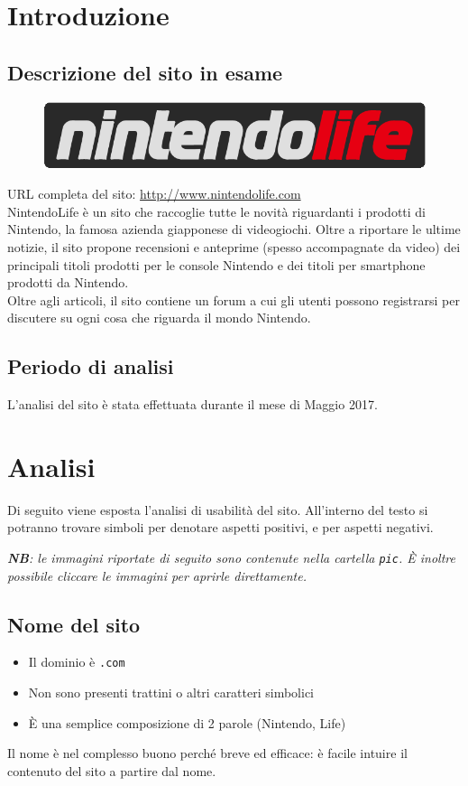 \documentclass[12pt, a4paper,titlepage]{article}
\newcommand{\cmark}{\ding{51}}%
\newcommand{\xmark}{\ding{55}}%
\begin{document}
\section{Introduzione}
\label{sec:introduzione}
\subsection{Descrizione del sito in esame}
\begin{figure}[h]
\centering
\includegraphics[width=.5\textwidth]{Logo_sito}
\end{figure}
URL completa del sito: \url{http://www.nintendolife.com}\\
NintendoLife è un sito che raccoglie tutte le novità riguardanti i prodotti di Nintendo, la famosa azienda giapponese di videogiochi. Oltre a riportare le ultime notizie, il sito propone recensioni e anteprime (spesso accompagnate da video) dei principali titoli prodotti per le console Nintendo e dei titoli per smartphone prodotti da Nintendo.\\
Oltre agli articoli, il sito contiene un forum a cui gli utenti possono registrarsi per discutere su ogni cosa che riguarda il mondo Nintendo.
\subsection{Periodo di analisi}
L'analisi del sito è stata effettuata durante il mese di Maggio 2017.

\section{Analisi} %
\label{sec:analisi}
Di seguito viene esposta l'analisi di usabilità del sito. All'interno del testo si potranno trovare simboli \cmark per denotare aspetti positivi, e \xmark per aspetti negativi.

\emph{\textbf{NB}: le immagini riportate di seguito sono contenute nella cartella \texttt{pic}. È inoltre possibile cliccare le immagini per aprirle direttamente.}
\subsection{Nome del sito}
\label{sec:nome-sito}
\begin{itemize}
    \item[\cmark] Il dominio è \texttt{.com}
    \item[\cmark] Non sono presenti trattini o altri caratteri simbolici
    \item[\cmark] È una semplice composizione di 2 parole (Nintendo, Life)
\end{itemize}
Il nome è nel complesso buono perché breve ed efficace: è facile intuire il contenuto del sito a partire dal nome.
\clearpage
\end{document}
